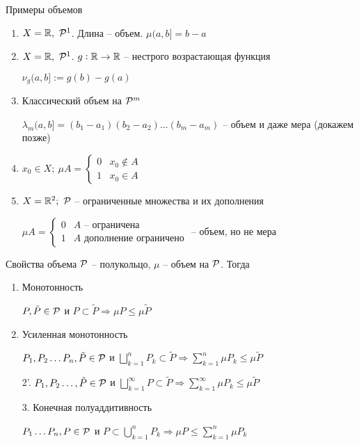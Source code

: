 \documentclass[12pt]{article}
\begin{document}
\begin{Example}{Примеры объемов}
    \begin{enumerate}
        \item $X = \R,\ \P^1$. Длина -- объем. $\mu(a, b] = b - a$
        \item $X = \R,\ \P^1$. $g : \R \to \R$ -- нестрого возрастающая функция
        
        $\nu_g(a, b] := g(b) - g(a)$

        \item Классический объем на $\P^m$
        
        $\lambda_m(a, b] = (b_1 - a_1)(b_2 - a_2) \ldots (b_m - a_m)$ -- объем и даже мера (докажем позже)

        \item $x_0 \in X;\ \mu A = \begin{cases}
            0 & x_0 \notin A \\
            1 & x_0 \in A
        \end{cases}$

        \item $X = \R^2;\ \P$ -- ограниченные множества и их дополнения
        
        $\mu A = \begin{cases}
            0 & A \text{ -- ограничена} \\
            1 & A \text{ дополнение ограничено}
        \end{cases}$ -- объем, но не мера
    \end{enumerate}
\end{Example}

\begin{theo}{Свойства объема}
    $\P$ -- полукольцо, $\mu$ -- объем на $\P$. Тогда 

    \begin{enumerate}
        \item Монотонность
        
        $P, \tilde{P} \in \P$ и $P \subset \tilde{P} \Rightarrow \mu P \leq \mu \tilde{P}$

        \item Усиленная монотонность 
        
        $P_1, P_2 \ldots P_n, \tilde{P} \in \P$ и $\bigsqcup\limits_{k = 1}^n P_k \subset \tilde{P} \Rightarrow \sum\limits_{k = 1}^n \mu P_k \leq \mu \tilde{P}$

        \item[2'.] $P_1, P_2 \ldots, \tilde{P} \in \P$ и $\bigsqcup\limits_{k = 1}^\infty P \subset \tilde{P} \Rightarrow \sum\limits_{k = 1}^\infty \mu P_k \leq \mu \tilde{P}$
        
        \item[3.] Конечная полуаддитивность
        
        $P_1 \ldots P_n, P \in \P$ и $P \subset \bigcup\limits_{k = 1}^n P_k \Rightarrow \mu P \leq \sum\limits_{k = 1}^n \mu P_k$
    \end{enumerate}
\end{theo}
\end{document}
